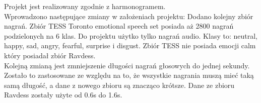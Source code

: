 \documentclass[12pt,titlepage]{article}
\begin{document}
Projekt jest realizowany zgodnie z harmonogramem.\\

Wprowadzono następujące zmiany w założeniach projektu:
Dodano kolejny zbiór nagrań. Zbiór TESS  Toronto emotional speech set posiada aż 2800 nagrań podzielonych na 6 klas.  Do projektu użytko tylko nagrań audio. Klasy to: neutral, happy, sad, angry, fearful, surprise i disgust. Zbiór TESS nie posiada emocji calm który posiadał zbiór Ravdess.\\
Kolejną zmianą jest zmniejszenie długości nagrań głosowych do jednej sekundy. Zostało to zastosowane ze względu na to, że wszystkie nagrania muszą mieć taką samą długość, a dane z nowego zbioru są znacząco krótsze. Dane ze zbioru Ravdess zostały użyte od 0.6s do 1.6s.
\end{document}
